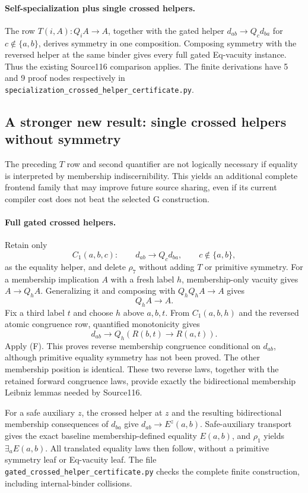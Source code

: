 \paragraph{Self-specialization plus single crossed helpers.}
The row $T(i,A):Q_iA\to A$, together with the gated helper
$d_{ab}\to Q_c d_{ba}$ for $c\notin\{a,b\}$, derives symmetry in one
composition.  Composing symmetry with the reversed helper at the same
binder gives every full gated Eq-vacuity instance.  Thus the existing
Source116 comparison applies.  The finite derivations have 5 and 9 proof
nodes respectively in
\texttt{specialization\_crossed\_helper\_certificate.py}.

\subsection{A stronger new result: single crossed helpers without symmetry}

The preceding $T$ row and second quantifier are not logically necessary
if equality is interpreted by membership indiscernibility.  This yields
an additional complete frontend family that may improve future source
sharing, even if its current compiler cost does not beat the selected G
construction.

\paragraph{Full gated crossed helpers.}
Retain only
\[
 C_1(a,b,c):\qquad d_{ab}\longrightarrow Q_c d_{ba},
 \qquad c\notin\{a,b\},
\]
as the equality helper, and delete $\rho_7$ without adding $T$ or
primitive symmetry.  For a membership implication $A$ with a fresh
label $h$, membership-only vacuity gives $A\to Q_hA$.
Generalizing it and composing with $Q_hQ_hA\to A$ gives
\[
 Q_hA\longrightarrow A.                                       \tag{F}
\]
Fix a third label $t$ and choose $h$ above $a,b,t$.
From $C_1(a,b,h)$ and the reversed atomic congruence row, quantified
monotonicity gives
\[
 d_{ab}\longrightarrow Q_h(R(b,t)\to R(a,t)).
\]
Apply (F).  This proves reverse membership congruence conditional on
$d_{ab}$, although primitive equality symmetry has not been proved.
The other membership position is identical.  These two reverse laws,
together with the retained forward congruence laws, provide exactly the
bidirectional membership Leibniz lemmas needed by Source116.

For a safe auxiliary $z$, the crossed helper at $z$ and the resulting
bidirectional membership consequences of $d_{ba}$ give
$d_{ab}\to E^z(a,b)$.  Safe-auxiliary transport gives the exact baseline
membership-defined equality $E(a,b)$, and $\rho_1$ yields
$\exists_aE(a,b)$.  All translated equality laws then follow, without a
primitive symmetry leaf or Eq-vacuity leaf.  The file
\texttt{gated\_crossed\_helper\_certificate.py} checks the complete
finite construction, including internal-binder collisions.

